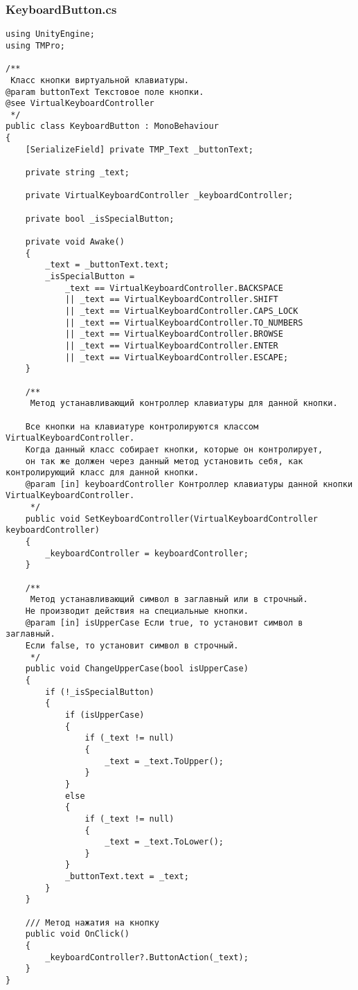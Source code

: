 \subsubsection*{KeyboardButton.cs}
\begin{verbatim}
﻿using UnityEngine;
using TMPro;

/**
 Класс кнопки виртуальной клавиатуры.
@param buttonText Текстовое поле кнопки.
@see VirtualKeyboardController
 */
public class KeyboardButton : MonoBehaviour
{
    [SerializeField] private TMP_Text _buttonText;

    private string _text;

    private VirtualKeyboardController _keyboardController;

    private bool _isSpecialButton;

    private void Awake()
    {
        _text = _buttonText.text;
        _isSpecialButton =
            _text == VirtualKeyboardController.BACKSPACE
            || _text == VirtualKeyboardController.SHIFT
            || _text == VirtualKeyboardController.CAPS_LOCK
            || _text == VirtualKeyboardController.TO_NUMBERS
            || _text == VirtualKeyboardController.BROWSE
            || _text == VirtualKeyboardController.ENTER
            || _text == VirtualKeyboardController.ESCAPE;
    }

    /**
     Метод устанавливающий контроллер клавиатуры для данной кнопки.

    Все кнопки на клавиатуре контролируются классом VirtualKeyboardController.
    Когда данный класс собирает кнопки, которые он контролирует, 
    он так же должен через данный метод установить себя, как контролирующий класс для данной кнопки.
    @param [in] keyboardController Контроллер клавиатуры данной кнопки VirtualKeyboardController.
     */
    public void SetKeyboardController(VirtualKeyboardController keyboardController)
    {
        _keyboardController = keyboardController;
    }

    /**
     Метод устанавливающий символ в заглавный или в строчный.
    Не производит действия на специальные кнопки.
    @param [in] isUpperCase Если true, то установит символ в заглавный.
    Если false, то установит символ в строчный.
     */
    public void ChangeUpperCase(bool isUpperCase)
    {
        if (!_isSpecialButton)
        {
            if (isUpperCase)
            {
                if (_text != null)
                {
                    _text = _text.ToUpper();
                }
            }
            else
            {
                if (_text != null)
                {
                    _text = _text.ToLower();
                }
            }
            _buttonText.text = _text;
        }
    }

    /// Метод нажатия на кнопку
    public void OnClick()
    {
        _keyboardController?.ButtonAction(_text);
    }
}

\end{verbatim}
